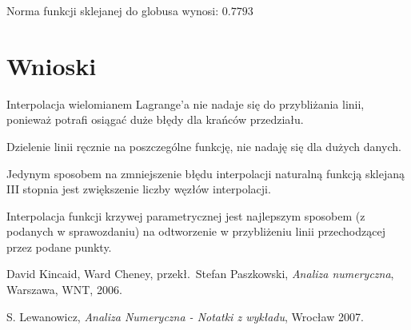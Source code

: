 \documentclass{article}
\begin{document}
		Norma funkcji sklejanej do globusa wynosi: $0.7793$
		

\section{Wnioski}

Interpolacja wielomianem Lagrange'a nie nadaje się do przybliżania linii, ponieważ potrafi osiągać duże błędy dla krańców przedziału.

Dzielenie linii ręcznie na poszczególne funkcję, nie nadaję się dla dużych danych.

Jedynym sposobem na zmniejszenie błędu interpolacji naturalną funkcją sklejaną III stopnia jest zwiększenie liczby węzłów interpolacji.

Interpolacja funkcji krzywej parametrycznej jest najlepszym sposobem (z podanych w sprawozdaniu) na odtworzenie w przybliżeniu linii przechodzącej przez podane punkty.







\begin{thebibliography}{9}
	\itemsep2pt
	 David Kincaid, Ward Cheney, przekł.~Stefan Paszkowski,
	\emph{Analiza numeryczna},
	Warszawa, WNT, 2006.
	
	 S. Lewanowicz, {\it Analiza Numeryczna - Notatki z wykładu}, Wrocław 2007.
		
\end{thebibliography}
\end{document}
